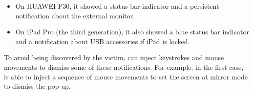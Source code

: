 \begin{itemize}
\begin{itemize}
		 \item On HUAWEI P30, it showed a status bar indicator and a persistent notification about the external monitor.
		 \item On iPad Pro (the third generation), it also showed a blue status bar indicator and a notification about \ac{USB} accessories if iPad is locked.
		\end{itemize}
		To avoid being discovered by the victim, \tool can inject keystrokes and mouse movements to dismiss some of these notifications. For example, in the first case, \tool is able to inject a sequence of mouse movements to set the screen at mirror mode to dismiss the pop-up.
\end{itemize}

